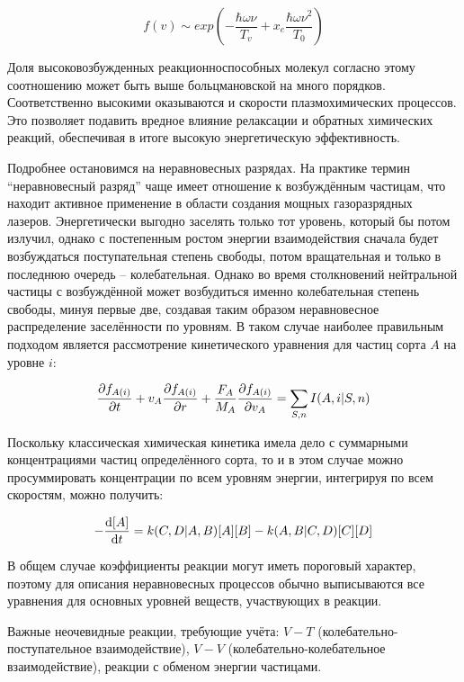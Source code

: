 \documentclass[10pt, a4paper]{article}
\begin{document}
\begin{equation*}
	f(v) \sim exp\left(-\frac{\hbar\omega\nu}{T_v} + x_e\frac{\hbar\omega\nu^2}{T_0}\right)
\end{equation*}

Доля высоковозбужденных реакционноспособных молекул согласно этому соотношению может быть выше больцмановской на много порядков. Соответственно высокими оказываются и скорости плазмохимических процессов. Это позволяет подавить вредное влияние релаксации и обратных химических реакций, обеспечивая в итоге высокую энергетическую эффективность. 

Подробнее остановимся на неравновесных разрядах. На практике термин ``неравновесный разряд'' чаще имеет отношение к возбуждённым частицам, что находит активное применение в области создания мощных газоразрядных лазеров. Энергетически выгодно заселять только тот уровень, который бы потом излучил, однако с постепенным ростом энергии взаимодействия сначала будет возбуждаться поступательная степень свободы, потом вращательная и только в последнюю очередь -- колебательная. Однако во время столкновений нейтральной частицы с возбуждённой может возбудиться именно колебательная степень свободы, минуя первые две, создавая таким образом неравновесное распределение заселённости по уровням. В таком случае наиболее правильным подходом является рассмотрение кинетического уравнения для частиц сорта $A$ на уровне $i$:

\begin{equation*}
	\pdv{f_{A(i)}}{t} + v_A \pdv{f_{A(i)}}{r} + \frac{F_A}{M_A}\pdv{f_{A(i)}}{v_A} = \sum_{S,n} I(A,i|S,n) 
\end{equation*}

Поскольку классическая химическая кинетика имела дело с суммарными концентрациями частиц определённого сорта, то и в этом случае можно просуммировать концентрации по всем уровням энергии, интегрируя по всем скоростям, можно получить:

\begin{equation*}
	-\dv{[A]}{t} = k(C,D|A,B) [A][B] - k(A,B|C,D) [C][D]
\end{equation*}

В общем случае коэффициенты реакции могут иметь пороговый характер, поэтому для описания неравновесных процессов обычно выписываются все уравнения для основных уровней веществ, участвующих в реакции.

Важные неочевидные реакции, требующие учёта: $V-T$ (колебательно-поступательное взаимодействие), $V-V$ (колебательно-колебательное взаимодействие), реакции с обменом энергии частицами.
\end{document}
